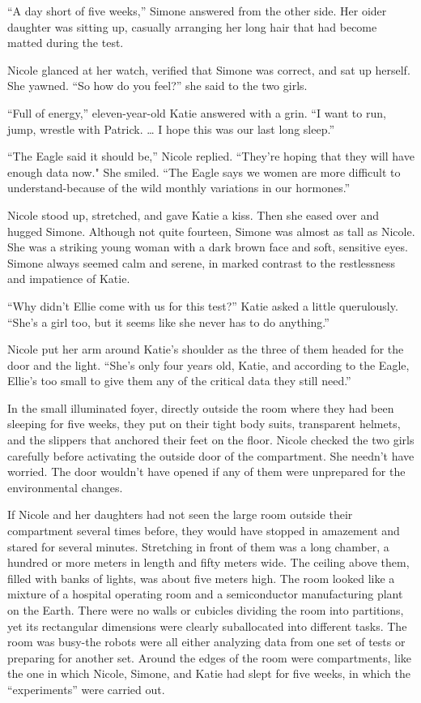 \documentclass[]{article}
\begin{document}
{“A day short of five weeks,” Simone answered from the other side.  Her oider daughter was sitting up, casually arranging her long hair that had become matted during the test.

Nicole glanced at her watch, verified that Simone was correct, and sat up herself.  She yawned.  “So how do you feel?” she said to the two girls.

“Full of energy,” eleven-year-old Katie answered with a grin.  “I want to run, jump, wrestle with Patrick.  … I hope this was our last long sleep.”

“The Eagle said it should be,” Nicole replied.  “They’re hoping that they will have enough data now."  She smiled.  “The Eagle says we women are more difficult to understand-because of the wild monthly variations in our hormones.”

Nicole stood up, stretched, and gave Katie a kiss.  Then she eased over and hugged Simone.  Although not quite fourteen, Simone was almost as tall as Nicole.  She was a striking young woman with a dark brown face and soft, sensitive eyes.  Simone always seemed calm and serene, in marked contrast to the restlessness and impatience of Katie.

“Why didn’t Ellie come with us for this test?” Katie asked a little querulously.  “She’s a girl too, but it seems like she never has to do anything.”

Nicole put her arm around Katie’s shoulder as the three of them headed for the door and the light.  “She’s only four years old, Katie, and according to the Eagle, Ellie’s too small to give them any of the critical data they still need.”

In the small illuminated foyer, directly outside the room where they had been sleeping for five weeks, they put on their tight body suits, transparent helmets, and the slippers that anchored their feet on the floor.  Nicole checked the two girls carefully before activating the outside door of the compartment.  She needn’t have worried.  The door wouldn’t have opened if any of them were unprepared for the environmental changes.

If Nicole and her daughters had not seen the large room outside their compartment several times before, they would have stopped in amazement and stared for several minutes.  Stretching in front of them was a long chamber, a hundred or more meters in length and fifty meters wide.  The ceiling above them, filled with banks of lights, was about five meters high.  The room looked like a mixture of a hospital operating room and a semiconductor manufacturing plant on the Earth.  There were no walls or cubicles dividing the room into partitions, yet its rectangular dimensions were clearly suballocated into different tasks.  The room was busy-the robots were all either analyzing data from one set of tests or preparing for another set.  Around the edges of the room were compartments, like the one in which Nicole, Simone, and Katie had slept for five weeks, in which the “experiments” were carried out.

}
\end{document}
